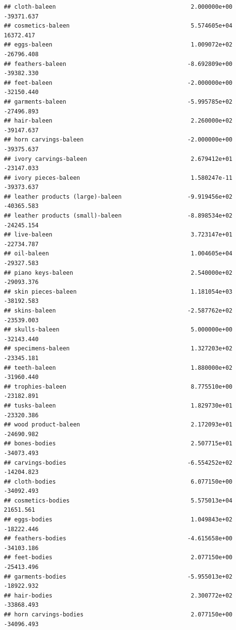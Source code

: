 \documentclass[
  12pt,
]{article}
\begin{document}
\begin{verbatim}
## cloth-baleen                                       2.000000e+00  -39371.637
## cosmetics-baleen                                   5.574605e+04   16372.417
## eggs-baleen                                        1.009072e+02  -26796.408
## feathers-baleen                                   -8.692809e+00  -39382.330
## feet-baleen                                       -2.000000e+00  -32150.440
## garments-baleen                                   -5.995785e+02  -27496.893
## hair-baleen                                        2.260000e+02  -39147.637
## horn carvings-baleen                              -2.000000e+00  -39375.637
## ivory carvings-baleen                              2.679412e+01  -23147.033
## ivory pieces-baleen                                1.580247e-11  -39373.637
## leather products (large)-baleen                   -9.919456e+02  -40365.583
## leather products (small)-baleen                   -8.898534e+02  -24245.154
## live-baleen                                        3.723147e+01  -22734.787
## oil-baleen                                         1.004605e+04  -29327.583
## piano keys-baleen                                  2.540000e+02  -29093.376
## skin pieces-baleen                                 1.181054e+03  -38192.583
## skins-baleen                                      -2.587762e+02  -23539.003
## skulls-baleen                                      5.000000e+00  -32143.440
## specimens-baleen                                   1.327203e+02  -23345.181
## teeth-baleen                                       1.880000e+02  -31960.440
## trophies-baleen                                    8.775510e+00  -23182.891
## tusks-baleen                                       1.829730e+01  -23320.386
## wood product-baleen                                2.172093e+01  -24690.982
## bones-bodies                                       2.507715e+01  -34073.493
## carvings-bodies                                   -6.554252e+02  -14204.823
## cloth-bodies                                       6.077150e+00  -34092.493
## cosmetics-bodies                                   5.575013e+04   21651.561
## eggs-bodies                                        1.049843e+02  -18222.446
## feathers-bodies                                   -4.615658e+00  -34103.186
## feet-bodies                                        2.077150e+00  -25413.496
## garments-bodies                                   -5.955013e+02  -18922.932
## hair-bodies                                        2.300772e+02  -33868.493
## horn carvings-bodies                               2.077150e+00  -34096.493

\end{verbatim}
\end{document}
